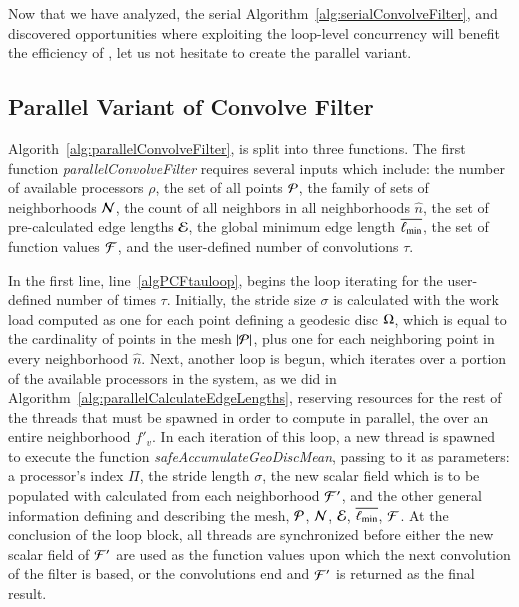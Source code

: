 Now that we have analyzed, the serial Algorithm~\ref{alg:serialConvolveFilter}, and discovered opportunities where exploiting the loop-level concurrency will benefit the efficiency of , let us not hesitate to create the parallel variant.

%
%
\subsection{Parallel Variant of Convolve Filter}
\label{ch6sCFPssPRCN}
Algorith~\ref{alg:parallelConvolveFilter}, is split into three functions. The first function \textit{parallelConvolveFilter} requires several inputs which include: the number of available processors $\rho$, the set of all points $\mathcal{P}$, the family of sets of neighborhoods $\mathcal{N}$, the count of all neighbors in all neighborhoods $\hat{n}$, the set of pre-calculated edge lengths $\mathcal{E}$, the global minimum edge length $\overline{\ell_\text{min}}$, the set of function values $\mathcal{F}$, and the user-defined number of convolutions $\tau$.

In the first line, line~\ref{algPCFtauloop}, begins the loop iterating for the user-defined number of times $\tau$. Initially, the stride size $\sigma$ is calculated with the work load computed as one for each point defining a geodesic disc $\Omega$, which is equal to the cardinality of points in the mesh $|\mathcal{P}|$, plus one for each neighboring point in every neighborhood $\hat{n}$. Next, another loop is begun, which iterates over a portion of the available processors in the system, as we did in Algorithm~\ref{alg:parallelCalculateEdgeLengths}, reserving resources for the rest of the threads that must be spawned in order to compute in parallel, the \wmfv{} over an entire neighborhood $f'_v$. In each iteration of this loop, a new thread is spawned to execute the function \textit{safeAccumulateGeoDiscMean}, passing to it as parameters: a processor's index $\Pi$, the stride length $\sigma$, the new scalar field which is to be populated with calculated  from each neighborhood $\mathcal{F}'$, and the other general information defining and describing the mesh, $\mathcal{P}$, $\mathcal{N}$, $\mathcal{E}$, $\overline{\ell_\text{min}}$, $\mathcal{F}$. At the conclusion of the loop block, all threads are synchronized before either the new scalar field of  $\mathcal{F}'$ are used as the function values upon which the next convolution of the filter is based, or the convolutions end and $\mathcal{F}'$ is returned as the final result.

